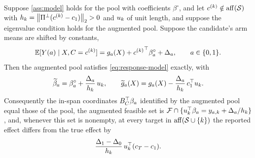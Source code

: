 \begin{proposition}
\label{prop:undetectable}
Suppose \cref{ass:model} holds for the pool with coefficients
$\beta^\circ$, and let $c^{(k)}\notin\operatorname{aff}(\mathcal S)$ with
$h_k=\left\|{\Pi^\perp(c^{(k)}-c_1)}\right\|_2>0$ and $u_{k}$ of unit
length, and suppose the eigenvalue condition holds for the augmented
pool. Suppose the candidate's arm means are shifted by constants,
\begin{equation}
  \mathbb{E}[Y(a)\mid X,C=c^{(k)}]
  =g_a(X)+{c^{(k)}}^\top\beta_a^\circ+\Delta_a,
  \qquad a\in\{0,1\}.
  \label{eq:site-shift}
\end{equation}
Then the augmented pool satisfies \eqref{eq:response-model} exactly,
with
\begin{equation}
  \widetilde\beta_a=\beta_a^\circ+\frac{\Delta_a}{h_k}\,u_{k},
  \qquad
  \widetilde g_a(X)=g_a(X)-\frac{\Delta_a}{h_k}\,c_1^\top u_{k}.
  \label{eq:shift-absorbed}
\end{equation}
Consequently the in-span coordinates $B_C^\top\beta_a$ identified by
the augmented pool equal those of the pool, the augmented feasible set
is $\mathcal F\cap\{u_{k}^\top\beta_a=y_{a,k}+\Delta_a/h_k\}$,
and, whenever this set is nonempty, at every target in
$\operatorname{aff}(\mathcal S\cup\{k\})$ the reported effect differs from the true
effect by
\begin{equation}
  \frac{\Delta_1-\Delta_0}{h_k}\,u_{k}^\top(c_T-c_1).
  \label{eq:shift-bias}
\end{equation}
\end{proposition}

